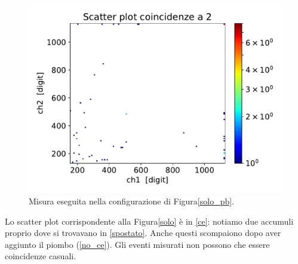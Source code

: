 \begin{figure}[h]
\centering
\includegraphics[width=\textwidth]{immagini/ce_pb}
\caption{Misura eseguita nella configurazione di Figura\autoref{solo_pb}.}
\label{no_ce}
\end{figure}



Lo scatter plot corrispondente alla Figura\autoref{solo} è in \autoref{ce}: notiamo due accumuli proprio dove si trovavano in \autoref{spostato}. Anche questi scompaiono dopo aver aggiunto il piombo (\autoref{no_ce}). Gli eventi misurati non possono che essere coincidenze casuali.

